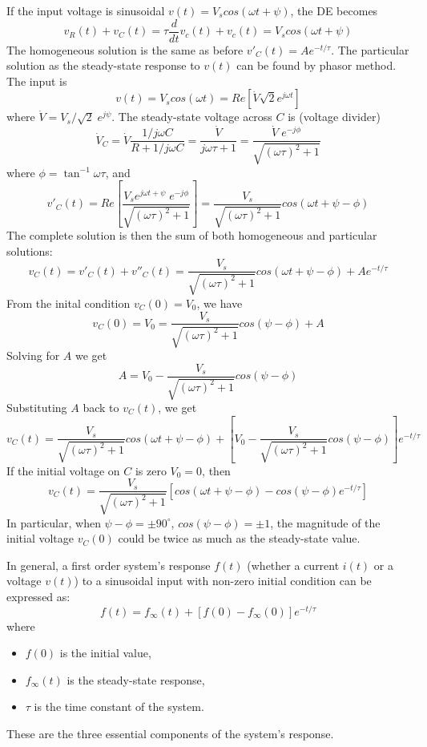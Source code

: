 If the input voltage is sinusoidal $v(t)=V_s cos(\omega t+\psi)$, the 
DE becomes
\[ v_R(t)+v_C(t)=\tau\frac{d}{dt} v_c(t)+v_c(t)=V_s cos(\omega t+\psi)	\]
The homogeneous solution is the same as before $v'_C(t)=A e^{-t/\tau}$.
The particular solution as the steady-state response to $v(t)$ can be
found by phasor method. The input is 
\[	v(t)=V_s cos(\omega t)=Re[\dot{V}\sqrt{2}e^{j\omega t}]	\]
where $\dot{V}=V_s/\sqrt{2}\;e^{j\psi}$. The steady-state voltage across
$C$ is (voltage divider)
\[	\dot{V}_C=\dot{V} \frac{1/j\omega C}{R+1/j\omega C}
	=\frac{\dot{V}}{j\omega \tau+1}	
	=\frac{\dot{V}\;e^{-j\phi}}{\sqrt{(\omega \tau)^2+1}} \]
where $\phi=\tan^{-1} \omega \tau$, and 
\[
v'_C(t)=Re[\frac{V_s e^{j\omega t+\psi}\;e^{-j\phi}}{\sqrt{(\omega \tau)^2+1}} ]
= \frac{V_s}{\sqrt{(\omega \tau)^2+1}} cos(\omega t+\psi-\phi)	\]
The complete solution is then the sum of both homogeneous and particular
solutions:
\[	v_C(t)=v'_C(t)+v''_C(t)=
\frac{V_s}{\sqrt{(\omega \tau)^2+1}}cos(\omega t+\psi-\phi)+A e^{-t/\tau}	\]
From the inital condition $v_C(0)=V_0$, we have
\[ v_C(0)=V_0=\frac{V_s}{\sqrt{(\omega \tau)^2+1}}cos(\psi-\phi)+A \]
Solving for $A$ we get
\[	A=V_0-\frac{V_s}{\sqrt{(\omega \tau)^2+1}}cos(\psi-\phi) \]
Substituting $A$ back to $v_C(t)$, we get 
\[  v_C(t)=\frac{V_s}{\sqrt{(\omega \tau)^2+1}}cos(\omega t+\psi-\phi)+ 
[V_0-\frac{V_s}{\sqrt{(\omega \tau)^2+1}}cos(\psi-\phi)] e^{-t/\tau}	\]
If the initial voltage on $C$ is zero $V_0=0$, then
\[  v_C(t)=\frac{V_s}{\sqrt{(\omega \tau)^2+1}}[cos(\omega t+\psi-\phi) 
-cos(\psi-\phi) e^{-t/\tau}]	\]
In particular, when $\psi-\phi=\pm 90^\circ$, $cos(\psi-\phi)=\pm 1$,
the magnitude of the initial voltage $v_C(0)$ could be twice as much as
the steady-state value.


In general, a first order system's response $f(t)$ (whether a current 
$i(t)$ or a voltage $v(t)$) to a sinusoidal input with non-zero initial 
condition can be expressed as:
\[	f(t)=f_\infty(t)+[f(0)-f_\infty(0)] e^{-t/\tau}	\]
where 
\begin{itemize}
\item $f(0)$ is the initial value, 
\item $f_\infty(t)$ is the steady-state response, 
\item $\tau$ is the time constant of the system.
\end{itemize}
These are the three essential components of the system's response.

